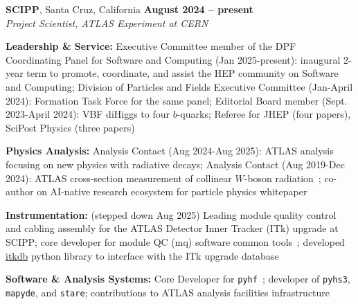 \documentclass[margin,line]{resume}
\begin{document}
\begin{resume}
\textbf{SCIPP}, Santa Cruz, California \hfill \textbf{August 2024 -- present}\\
\textsl{Project Scientist, ATLAS Experiment at CERN}
\begin{list2}
  \item \textbf{Leadership \& Service:} Executive Committee member of the DPF Coordinating Panel for Software and Computing (Jan 2025-present): inaugural 2-year term to promote, coordinate, and assist the HEP community on Software and Computing; Division of Particles and Fields Executive Committee (Jan-April 2024): Formation Task Force for the same panel; Editorial Board member (Sept. 2023-April 2024): VBF diHiggs to four $b$-quarks; Referee for JHEP (four papers), SciPost Physics (three papers)
  \item \textbf{Physics Analysis:} Analysis Contact (Aug 2024-Aug 2025): ATLAS analysis focusing on new physics with radiative decays; Analysis Contact (Aug 2019-Dec 2024): ATLAS cross-section measurement of collinear $W$-boson radiation~\cite{ATLAS:2024mow}; co-author on AI-native research ecosystem for particle physics whitepaper~\cite{CraigGroup:2026qmr}
  \item \textbf{Instrumentation:} (stepped down Aug 2025) Leading module quality control and cabling assembly for the ATLAS Detector Inner Tracker (ITk) upgrade at SCIPP; core developer for module QC (mq) software common tools~\cite{mqt, mqat, mqdbt, ldb}; developed \href{https://pypi.org/project/itkdb/}{itkdb} python library to interface with the ITk upgrade database
  \item \textbf{Software \& Analysis Systems:} Core Developer for \texttt{pyhf}~\cite{ATL-PHYS-PUB-2019-029}; developer of \texttt{pyhs3}, \texttt{mapyde}, and \texttt{stare}; contributions to ATLAS analysis facilities infrastructure
\end{list2}



\end{resume}
\end{document}
